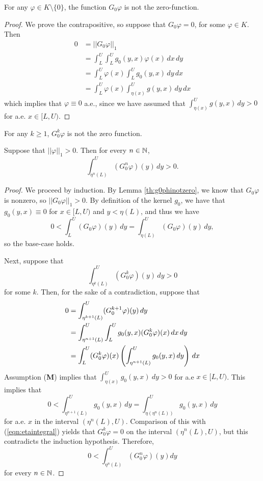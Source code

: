 \begin{lemma} \label{th:g0phinotzero}
	For any $\varphi \in K \setminus \{0\}$, the function $G_0 \varphi $ is not the zero-function.
\end{lemma}

\begin{proof}
	We prove the contrapositive, so suppose that $G_0 \varphi = 0$, for some $\varphi \in K$. Then
	\begin{align*}
		0 &= ||G_0 \varphi||_1 \\
		&=\int_L^U \int_L^U g_0(y,x) \varphi(x) \, dx \, dy \\
		&=\int_L^U \varphi(x) \int_L^U g_0(y,x) \, dy \, dx \\
		&=\int_L^U \varphi(x) \int_{\eta(x)}^U g(y,x) \, dy \, dx
	\end{align*}
	which implies that $\varphi \equiv 0$ a.e., since we have assumed that $\int_{\eta(x)}^U g(y,x) \, dy >0$ for a.e. $x \in [L,U)$.
	
\end{proof}

\begin{corollary}
	For any $k \geq 1$, $G_0^k \varphi$ is not the zero function.
\end{corollary}

\begin{lemma} \label{th:growingbig}
	Suppose that $||\varphi||_1 >0$. Then for every $n \in \mathbb{N}$,
	\[\int_{\eta^n(L)}^U (G_0^n\varphi)(y) \, dy >0.\]
\end{lemma}

\begin{proof}
	We proceed by induction. By Lemma \ref{th:g0phinotzero}, we know that $G_0 \varphi$ is nonzero, so $||G_0 \varphi||_1 >0$. By definition of the kernel $g_0$, we have that $g_0(y,x) \equiv 0$ for $x \in [L,U)$ and $y<\eta(L)$, and thus we have
	\[0 < \int_L^U (G_0 \varphi)(y) \, dy = \int_{\eta(L)}^U (G_0 \varphi)(y) \, dy,\]
	so the base-case holds.
	
	Next, suppose that
	\[\int_{\eta^k(L)}^U (G_0^k \varphi)(y) \, dy >0\]
	for some $k$. Then, for the sake of a contradiction, suppose that
	\begin{align}
		0 &= \int_{\eta^{k+1}(L)}^U (G_0^{k+1}\varphi)(y) \, dy \notag \\
		&= \int_{\eta^{n+1}(L)}^U \int_L^U g_0(y,x) (G_0^k \varphi)(x) \, dx \, dy \notag \\
		&=\int_L^U (G_0^k \varphi)(x) \left( \int_{\eta^{n+1}(L)}^U g_0(y,x) \, dy \right) \, dx \label{eqn:etaintegral}
	\end{align}
	Assumption (\textbf M) implies that $\int_{\eta(x)}^U g_0(y,x) \ dy > 0$ for a.e $x \in [L,U)$. This implies that 
	\[0< \int_{\eta^{n+1}(L)}^U g_0(y,x) \, dy = \int_{\eta(\eta^n(L))}^U g_0(y,x) \, dy\]
	for a.e. $x$ in the interval $(\eta^n(L), U)$. Comparison of this with (\ref{eqn:etaintegral}) yields that $G_0^k \varphi = 0$ on the interval $(\eta^n(L),U)$, but this contradicts the induction hypothesis. Therefore,
	\[0< \int_{\eta^n(L)}^U (G_0^n \varphi)(y) dy\]
	for every $n \in \mathbb{N}$.
	
\end{proof}

